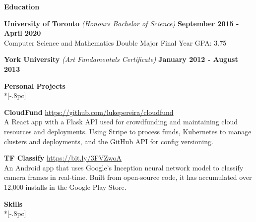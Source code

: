 \documentclass{article}
\begin{document}
\vspace{4pt}
{\large \bf Education} \\[-.8pc]
\underline{\hspace{7in}} 

{\bf University of Toronto} {\textit{(Honours Bachelor of Science)}} \hfill {\bf September 2015 - April 2020} \\[.2pc]
Computer Science and Mathematics Double Major  \hfill {Final Year GPA: 3.75}

{\bf York University} {\textit{(Art Fundamentals Certificate)}} \hfill {\bf January 2012 - August 2013 \/} 

\vspace{4pt}
{\large \bf Personal Projects} \\*[-.8pc]
\underline{\hspace{7in}}

\textbf{CloudFund} \hfill \url{https://github.com/lukepereira/cloudfund}\\
A React app with a Flask API used for crowdfunding and maintaining cloud resources and deployments. Using Stripe to process funds, Kubernetes to manage clusters and deployments, and the GitHub API for config versioning.

\textbf{TF Classify} \hfill \url{https://bit.ly/3FVZwoA}\\
An Android app that uses Google’s Inception neural network model to classify camera frames in real-time. Built from open-source code, it has accumulated over 12,000 installs in the Google Play Store.

\vspace{4pt}
{\large \bf Skills} \\*[-.8pc]
\underline{\hspace{7in}}
\end{document}
